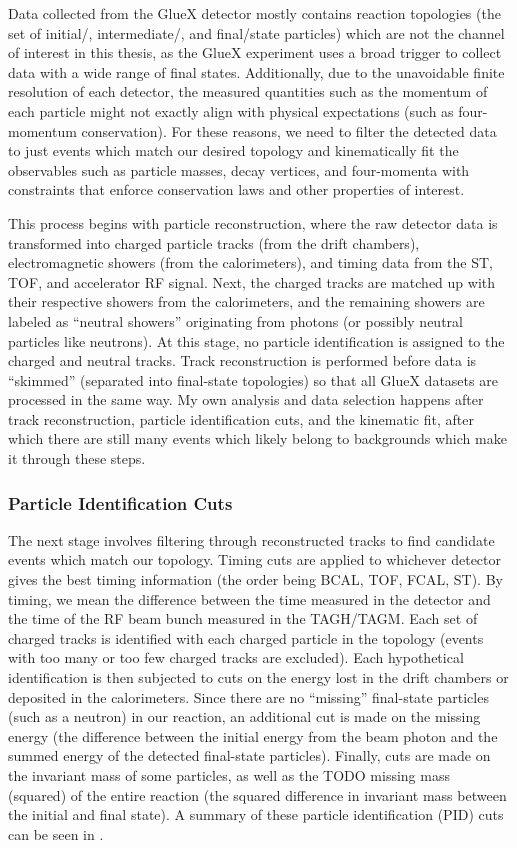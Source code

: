 Data collected from the GlueX detector mostly contains reaction topologies (the set of initial\-/, intermediate\-/, and final\-/state particles) which are not the channel of interest in this thesis, as the GlueX experiment uses a broad trigger to collect data with a wide range of final states. Additionally, due to the unavoidable finite resolution of each detector, the measured quantities such as the momentum of each particle might not exactly align with physical expectations (such as four-momentum conservation). For these reasons, we need to filter the detected data to just events which match our desired topology and kinematically fit the observables such as particle masses, decay vertices, and four-momenta with constraints that enforce conservation laws and other properties of interest.

This process begins with particle reconstruction, where the raw detector data is transformed into charged particle tracks (from the drift chambers), electromagnetic showers (from the calorimeters), and timing data from the ST, TOF, and accelerator RF signal. Next, the charged tracks are matched up with their respective showers from the calorimeters, and the remaining showers are labeled as ``neutral showers'' originating from photons (or possibly neutral particles like neutrons). At this stage, no particle identification is assigned to the charged and neutral tracks. Track reconstruction is performed before data is ``skimmed'' (separated into final-state topologies) so that all GlueX datasets are processed in the same way. My own analysis and data selection happens after track reconstruction, particle identification cuts, and the kinematic fit, after which there are still many events which likely belong to backgrounds which make it through these steps.

\subsubsection{Particle Identification Cuts}

The next stage involves filtering through reconstructed tracks to find candidate events which match our topology. Timing cuts are applied to whichever detector gives the best timing information (the order being BCAL, TOF, FCAL, ST). By timing, we mean the difference between the time measured in the detector and the time of the RF beam bunch measured in the TAGH/TAGM. Each set of charged tracks is identified with each charged particle in the topology (events with too many or too few charged tracks are excluded). Each hypothetical identification is then subjected to cuts on the energy lost in the drift chambers or deposited in the calorimeters. Since there are no ``missing'' final-state particles (such as a neutron) in our reaction, an additional cut is made on the missing energy (the difference between the initial energy from the beam photon and the summed energy of the detected final-state particles). Finally, cuts are made on the invariant mass of some particles, as well as the {\color{red}TODO} missing mass (squared) of the entire reaction (the squared difference in invariant mass between the initial and final state). A summary of these particle identification (PID) cuts can be seen in .

